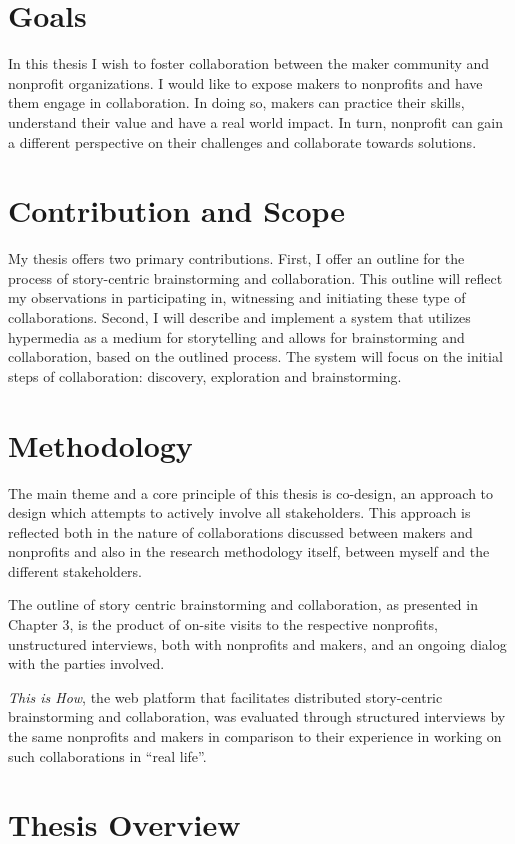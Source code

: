 \section{Goals}
In this thesis I wish to foster collaboration between the maker community and nonprofit organizations. I would like to expose makers to nonprofits and have them engage in collaboration. In doing so, makers can practice their skills, understand their value and have a real world impact. In turn, nonprofit can gain a different perspective on their challenges and collaborate towards solutions. 

\section{Contribution and Scope}
My thesis offers two primary contributions. First, I offer an outline for the process of story-centric brainstorming and collaboration. This outline will reflect my observations in participating in, witnessing and initiating these type of collaborations. Second, I will describe and implement a system that utilizes hypermedia as a medium for storytelling and allows for brainstorming and collaboration, based on the outlined process. The system will focus on the initial steps of collaboration: discovery, exploration and brainstorming. 

\section{Methodology} 
The main theme and a core principle of this thesis is co-design, an approach to design which attempts to actively involve all stakeholders. This approach is reflected both in the nature of collaborations discussed between makers and nonprofits and also in the research methodology itself, between myself and the different stakeholders. 

The outline of story centric brainstorming and collaboration, as presented in Chapter 3, is the product of on-site visits to the respective nonprofits, unstructured interviews, both with nonprofits and makers, and an ongoing dialog with the parties involved. 

\textit{This is How}, the web platform that facilitates distributed story-centric brainstorming and collaboration, was evaluated through structured interviews by the same nonprofits and makers in comparison to their experience in working on such collaborations in ``real life''. 

\section{Thesis Overview}

